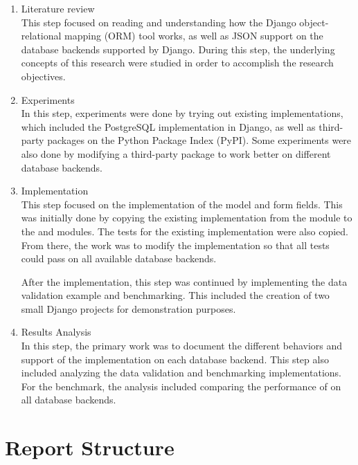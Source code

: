 \begin{enumerate}
    \item Literature review \\
    This step focused on reading and understanding how the Django
    object-relational mapping (ORM) tool works, as well as JSON support on the
    database backends supported by Django. During this step, the underlying
    concepts of this research were studied in order to accomplish the research
    objectives.

    \item Experiments \\
    In this step, experiments were done by trying out existing 
    implementations, which included the PostgreSQL implementation in Django, as
    well as third-party packages on the Python Package Index (PyPI). Some
    experiments were also done by modifying a third-party package to work
    better on different database backends.

    \item Implementation \\
    This step focused on the implementation of the  model and
    form fields. This was initially done by copying the existing implementation
    from the  module to the
     and  modules. The tests for the
    existing implementation were also copied. From there, the work was to
    modify the  implementation so that all tests could pass on
    all available database backends.

    After the  implementation, this step was continued by
    implementing the data validation example and benchmarking. This included
    the creation of two small Django projects for demonstration purposes.

    \item Results Analysis \\
    In this step, the primary work was to document the different behaviors and
    support of the  implementation on each database backend.
    This step also included analyzing the data validation and benchmarking
    implementations. For the benchmark, the analysis included comparing the
    performance of  on all database backends.
\end{enumerate}

\section{Report Structure}

